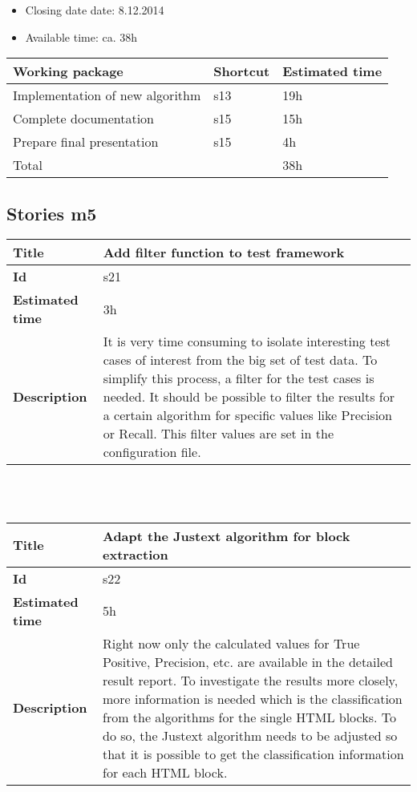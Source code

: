 \begin{itemize}
\item Closing date date: 8.12.2014
\item Available time: ca. 38h
\end{itemize}

    \begin{tabular}{ | p{10cm} | p{2cm} | p{2cm} |}
    \hline
    \textbf{Working package} & \textbf{Shortcut}& \textbf{Estimated time} \\ \hline
    Implementation of new algorithm & s13 & 19h \\
    Complete documentation & s15 & 15h \\
    Prepare final presentation & s15 & 4h \\ \hline
    Total &  & 38h\\
    \hline
    \end{tabular}

\subsection {Stories m5}

    \begin{tabular}{ | p{4cm} | p{10cm} |}
    \hline
    \textbf{Title} & Add filter function to test framework\\ \hline
    \textbf{Id} & s21\\ \hline
    \textbf{Estimated time} & 3h \\ \hline
    \textbf{Description} &  It is very time consuming to isolate interesting test cases of interest from the big set of test data. To simplify this process, a filter for the test cases is needed. It should be possible to filter the results for a certain algorithm for specific values like Precision or Recall. This filter values are set in the configuration file.\\ 
    \hline
    \end{tabular} \\\\

    \begin{tabular}{ | p{4cm} | p{10cm} |}
    \hline
    \textbf{Title} & Adapt the Justext algorithm for block extraction\\ \hline
    \textbf{Id} & s22\\ \hline
    \textbf{Estimated time} & 5h \\ \hline
    \textbf{Description} &  Right now only the calculated values for True Positive, Precision, etc. are available in the detailed result report. To investigate the results more closely, more information is needed which is the classification from the algorithms for the single HTML blocks. To do so, the Justext algorithm needs to be adjusted so that it is possible to get the classification information for each HTML block.\\ 
    \hline
    \end{tabular} \\\\

